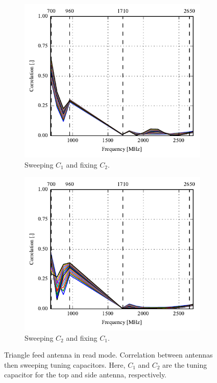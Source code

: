 \begin{figure}[htbp]
    \centering
    \begin{subfigure}{0.49\linewidth}
        \includegraphics{img/tech_sol/trianglefeed/read_mode/correlation_Csh1-sweep}
        \caption{Sweeping $C_1$ and fixing $C_2$.}
    \end{subfigure}
    \hfill
    \begin{subfigure}{0.49\linewidth}
        \includegraphics{img/tech_sol/trianglefeed/read_mode/correlation_Csh2-sweep}
        \caption{Sweeping $C_2$ and fixing $C_1$.}
    \end{subfigure}
    \caption{Triangle feed antenna in read mode. Correlation between antennas then sweeping tuning capacitors. Here, $C_1$ and $C_2$ are the tuning capacitor for the top and side antenna, respectively.}
    \label{fig:corr_sol2_read}
\end{figure}


